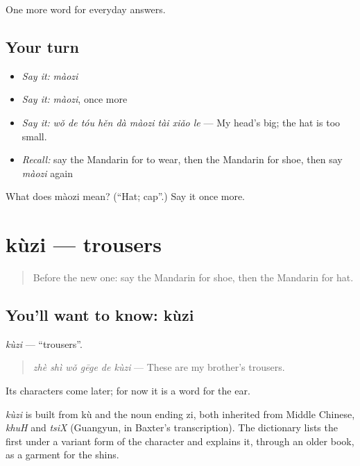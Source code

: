 \begin{grammarlens}[title={What you've built}]
One more word for everyday answers.
\end{grammarlens}

\subsection*{Your turn}
\begin{itemize}
\raggedright
  \item \emph{Say it:} \emph{màozi}
  \item \emph{Say it:} \emph{màozi}, once more
  \item \emph{Say it:} \emph{wǒ de tóu hěn dà màozi tài xiǎo le} — My head's big; the hat is too small.
  \item \emph{Recall:} say the Mandarin for to wear, then the Mandarin for shoe, then say \emph{màozi} again
\end{itemize}

\begin{tcolorbox}[breakable,colback=teal!4,colframe=teal!35!black,title={Before you move on}]
What does màozi mean? (\textquotedblleft{}Hat; cap\textquotedblright{}.) Say it once more.
\end{tcolorbox}
\section[kùzi]{kùzi — trousers}

\label{lesson:ZH-C59-kuzi}



\begin{quote}
Before the new one: say the Mandarin for shoe, then the Mandarin for hat.
\end{quote}

\subsection*{You'll want to know: kùzi}
\emph{kùzi} — \textquotedblleft{}trousers\textquotedblright{}.

\begin{quote}
\emph{zhè shì wǒ gēge de kùzi} — These are my brother's trousers.
\end{quote}

Its characters come later; for now it is a word for the ear.

\begin{cousinweb}
\emph{kùzi} is built from kù and the noun ending zi, both inherited from Middle Chinese, \emph{khuH} and \emph{tsiX} (Guangyun, in Baxter's transcription). The dictionary lists the first under a variant form of the character and explains it, through an older book, as a garment for the shins.
\end{cousinweb}

